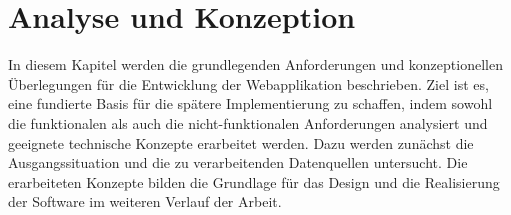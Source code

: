 \newpage
\section{Analyse und Konzeption}
\label{sec:analyse-und-konzeption}


In diesem Kapitel werden die grundlegenden Anforderungen und konzeptionellen
Überlegungen für die Entwicklung der Webapplikation beschrieben.
Ziel ist es, eine fundierte Basis für die spätere Implementierung zu schaffen, indem sowohl die
funktionalen als auch die nicht-funktionalen Anforderungen analysiert und geeignete technische Konzepte erarbeitet werden.
Dazu werden zunächst die Ausgangssituation und die zu verarbeitenden Datenquellen untersucht.
Die erarbeiteten Konzepte bilden die Grundlage für das Design und die Realisierung der Software im weiteren Verlauf der Arbeit.








